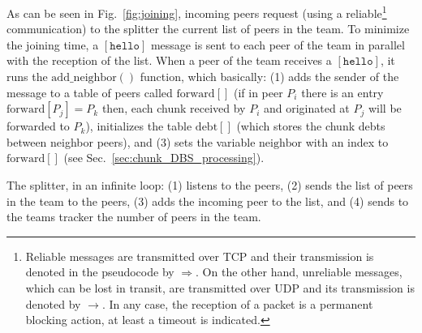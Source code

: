 \label{sec:peer_joining}
\begin{figure*}
   \caption{Procedures involved in a peer
    joining.\label{fig:joining}}
\end{figure*}

As can be seen in Fig.~\ref{fig:joining}, incoming peers request
(using a reliable\footnote{Reliable messages are transmitted over TCP
  and their transmission is denoted in the pseudocode by
  $\Rightarrow$. On the other hand, unreliable messages, which can be
  lost in transit, are transmitted over UDP and its transmission is
  denoted by $\rightarrow$. In any case, the reception of a packet is
  a permanent blocking action, at least a timeout is indicated.}
communication) to the splitter the current list of peers in the
team. To minimize the joining time, a $[\mathtt{hello}]$ message is
sent to each peer of the team in parallel with the reception of the
list. When a peer of the team receives a $[\mathtt{hello}]$, it runs
the $\mathrm{add}\_\mathrm{neighbor}()$ function, which basically: (1)
adds the sender of the message to a table of peers called
$\mathrm{forward}[]$ (if in peer $P_i$ there is an entry
$\mathrm{forward}[P_j]=P_k$ then, each chunk received by $P_i$ and
originated at $P_j$ will be forwarded to $P_k$), initializes the table
$\mathrm{debt}[]$ (which stores the chunk debts between neighbor
peers), and (3) sets the variable $\mathrm{neighbor}$ with an index to
$\mathrm{forward}[]$ (see Sec.~\ref{sec:chunk_DBS_processing}).

The splitter, in an infinite loop: (1) listens to the peers, (2) sends
the list of peers in the team to the peers, (3) adds the incoming peer
to the list, and (4) sends to the teams tracker the number of peers
in the team.
